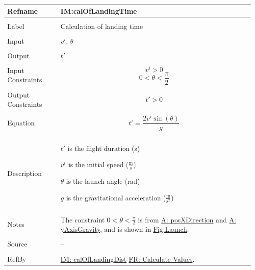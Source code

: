 \documentclass[12pt]{article}
\begin{document}
\noindent \begin{minipage}{\textwidth}
\begin{tabular}{p{} p{}}
\toprule \textbf{Refname} & \textbf{IM:calOfLandingTime}
\label{IM:calOfLandingTime}
\\ \midrule \\
Label & Calculation of landing time
\\ \midrule \\
Input & ${v^{i}}$, $θ$
\\ \midrule \\
Output & $t'$
\\ \midrule \\
Input Constraints & \begin{displaymath}
                    {v^{i}}>0
                    \end{displaymath}
                    \begin{displaymath}
                    0<θ<\frac{π}{2}
                    \end{displaymath}
\\ \midrule \\
Output Constraints & \begin{displaymath}
                     t'>0
                     \end{displaymath}
\\ \midrule \\
Equation & \begin{displaymath}
           t'=\frac{2 {v^{i}} \sin\left(θ\right)}{g}
           \end{displaymath}
\\ \midrule \\
Description & \begin{symbDescription}
              \item{$t'$ is the flight duration (s)}
              \item{${v^{i}}$ is the initial speed ($\frac{\text{m}}{\text{s}}$)}
              \item{$θ$ is the launch angle (rad)}
              \item{$g$ is the gravitational acceleration ($\frac{\text{m}}{\text{s}^{2}}$)}
              \end{symbDescription}
\\ \midrule \\
Notes & The constraint $0<θ<\frac{π}{2}$ is from \hyperref[posXDirection]{A: posXDirection} and \hyperref[yAxisGravity]{A: yAxisGravity}, and is shown in \hyperref[Figure:Launch]{Fig:Launch}.
\\ \midrule \\
Source & --
\\ \midrule \\
RefBy & \hyperref[IM:calOfLandingDist]{IM: calOfLandingDist} \hyperref[calcValues]{FR: Calculate-Values}.
\\ \bottomrule \end{tabular}
\end{minipage}
\end{document}
